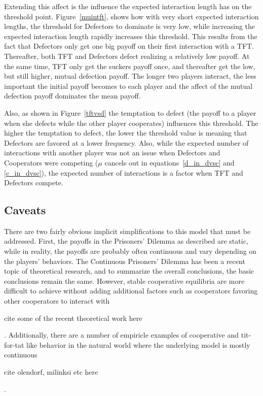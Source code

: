 \documentclass[11pt]{article} %
\begin{document}
Extending this affect is the influence the expected interaction length has on the threshold point.  Figure~\ref{muintft}, shows how with very short expected interaction lengths, the threshold for Defectors to dominate is very low, while increasing the expected interaction length rapidly increases this threshold. This results from the fact that Defectors only get one big payoff on their first interaction with a TFT. Thereafter, both TFT and Defectors defect realizing a relatively low payoff. At the same time, TFT only get the suckers payoff once, and thereafter get the low, but still higher, mutual defection payoff. The longer two players interact, the less important the initial payoff becomes to each player and the affect of the mutual defection payoff dominates the mean payoff.

Also, as shown in Figure~\ref{tftvsd} the temptation to defect (the payoff to a player when she defects while the other player cooperates) influences this threshold. The higher the temptation to defect, the lower the threshold value is meaning that Defectors are favored at a lower frequency. Also, while the expected number of interactions with another player was not an issue when Defectors and Cooperators were competing ($\mu$ cancels out in equations~\ref{d_in_dvsc} and \ref{c_in_dvsc}), the expected number of interactions is a factor when TFT and Defectors compete. 

\subsection{Caveats}
There are two fairly obvious implicit simplifications to this model that must be addressed. First, the payoffs in the Prisoners' Dilemma as described are static, while in reality, the payoffs are probably often continuous and vary depending on the players' behaviors. The Continuous Prisoners' Dilemma has been a recent topic of theoretical research, and to summarize the overall conclusions, the basic conclusions remain the same. However, stable cooperative equilibria are more difficult to achieve without adding additional factors such as cooperators favoring other cooperators to interact with \begin{em}cite some of the recent theoretical work here\end{em}. Additionally, there are a number of empiricle examples of cooperative and tit-for-tat like behavior in the natural world where the underlying model is mostly continuous \begin{em}cite olendorf, milinksi etc here\end{em}.
\end{document}
